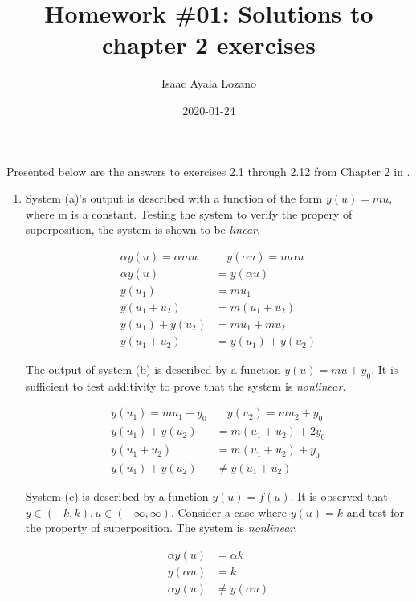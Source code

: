 \documentclass[a4paper,12pt]{article}
\title{Homework \#01: Solutions to chapter 2 exercises}
\author{Isaac Ayala Lozano}
\date{2020-01-24}
\begin{document}
\maketitle

Presented below are the answers to exercises 2.1 through 2.12 from Chapter 2 in \cite{chen1999linear}.

\begin{enumerate}
 \item System (a)'s output is described with a function of the form $y(u) = mu$, where m is a constant.
 Testing the system to verify the propery of superposition, the system is shown to be \emph{linear}.

 \begin{align*}
  \alpha y(u) = \alpha mu  & \quad  y(\alpha u) =  m \alpha  u \\
  \alpha y(u) &= y(\alpha u)\\
  y(u_1) &= m u_1 \\
  y (u_1 + u_2) &= m (u_1 + u_2)\\
  y(u_1) + y(u_2) &= m u_1 + mu_2\\
  y (u_1 + u_2) &= y(u_1) + y(u_2)
 \end{align*}

The output of system (b) is described by a function $y(u) = m u + y_0$.
It is sufficient to test additivity to prove that the system is \emph{nonlinear}.

\begin{align*}
 y(u_1) = m u_1 + y_0 & \quad y(u_2) = m u_2 + y_0 \\
 y(u_1) + y(u_2) &= m (u_1 +u_2) + 2y_0\\
 y (u_1 + u_2) &= m ( u_1 + u_2) + y_0\\
 y(u_1) + y(u_2)  &\neq y (u_1 + u_2)
\end{align*}

System (c) is described by a function $y(u) = f(u)$.
It is observed that $y \in (-k, k), u \in (-\infty, \infty)$.
Consider a case where $y(u) = k$ and test for the property of superposition.
The system is \emph{nonlinear}.

\begin{align*}
 \alpha y(u) &= \alpha k\\
 y (\alpha u) &= k\\
 \alpha y(u) &\neq y(\alpha u)
\end{align*}


\end{enumerate}
\end{document}
